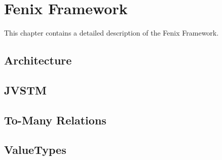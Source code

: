 \chapter{Fenix Framework}
\label{chap:ff}

This chapter contains a detailed description of the Fenix Framework.

\section{Architecture}

\section{JVSTM}

\section{To-Many Relations}

\section{ValueTypes}
